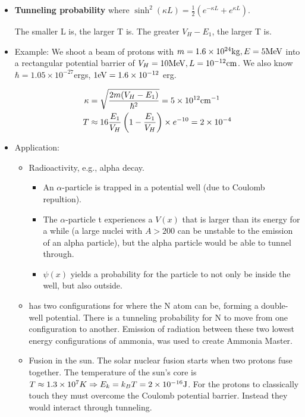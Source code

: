 \documentclass{school-22.101-notes}
\begin{document}
\begin{itemize}
\item \textbf{Tunneling probability}
where $\sinh^2 (\kappa L) = \frac{1}{2} ( e^{-\kappa L} + e^{\kappa L})$. 

The smaller L is, the larger T is. The greater $V_H - E_1$, the larger T is. 


\item Example: We shoot a beam of protons with $m = 1.6 \times 10^{24} \mathrm{kg}, E = 5 \mathrm{MeV}$ into a rectangular potential barrier of $V_H = 10 \mathrm{MeV}, L = 10^{-12} \mathrm{cm}$. We also know $\hbar = 1.05 \times 10^{-27} $ergs, $1\mathrm{eV} = 1.6 \times 10^{-12}$ erg.

\begin{align}
\kappa &= \sqrt{\frac{2 m (V_H - E_1)}{\hbar^2}} = 5 \times 10^{12} \mathrm{cm}^{-1} \\
T &\approx 16 \frac{E_1}{V_H} \left( 1 - \frac{E_1}{V_H} \right) \times e^{-10} = 2 \times 10^{-4} \\
\end{align}

\item Application: 
\begin{itemize}
\item Radioactivity, e.g., alpha decay. 
  \begin{itemize}
  \item An $\alpha$-particle is trapped in a potential well (due to Coulomb repultion). 
  \item The $\alpha$-particle t experiences a $V(x)$ that is larger than its energy for a while (a large nuclei with $A > 200$ can be unstable to the emission of an alpha particle), but the alpha particle would be able to tunnel through. 
  \item $\psi(x)$ yields a probability for the particle to not only be inside the well, but also outside. 
\end{itemize}

\item {} has two configurations for where the N atom can be, forming a double-well potential. There is a tunneling probability for N to move from one configuration to another. Emission of radiation between these two lowest energy configurations of ammonia, was used to create Ammonia Master. 

\item Fusion in the sun. The solar nuclear fusion starts when two protons fuse together. The temperature of the sun's core is $T \approx 1.3 \times 10^7 K \Rightarrow E_k = k_B T = 2 \times 10^{-16} \mathrm{J}$. For the protons to classically touch they must overcome the Coulomb potential barrier. Instead they would interact through tunneling.  


\end{itemize}
\end{itemize}
\end{document}
